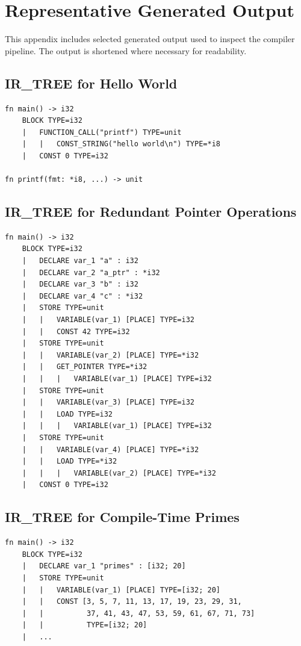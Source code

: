 \chapter{Representative Generated Output}
\label{app:generated}

This appendix includes selected generated output used to inspect the compiler
pipeline. The output is shortened where necessary for readability.

\section{IR\_TREE for Hello World}

\begin{lstlisting}[caption={Typed tree for hello world}]
fn main() -> i32
    BLOCK TYPE=i32
    |   FUNCTION_CALL("printf") TYPE=unit
    |   |   CONST_STRING("hello world\n") TYPE=*i8
    |   CONST 0 TYPE=i32

fn printf(fmt: *i8, ...) -> unit
\end{lstlisting}

\section{IR\_TREE for Redundant Pointer Operations}

\begin{lstlisting}[caption={Simplified redundant address and dereference operations}]
fn main() -> i32
    BLOCK TYPE=i32
    |   DECLARE var_1 "a" : i32
    |   DECLARE var_2 "a_ptr" : *i32
    |   DECLARE var_3 "b" : i32
    |   DECLARE var_4 "c" : *i32
    |   STORE TYPE=unit
    |   |   VARIABLE(var_1) [PLACE] TYPE=i32
    |   |   CONST 42 TYPE=i32
    |   STORE TYPE=unit
    |   |   VARIABLE(var_2) [PLACE] TYPE=*i32
    |   |   GET_POINTER TYPE=*i32
    |   |   |   VARIABLE(var_1) [PLACE] TYPE=i32
    |   STORE TYPE=unit
    |   |   VARIABLE(var_3) [PLACE] TYPE=i32
    |   |   LOAD TYPE=i32
    |   |   |   VARIABLE(var_1) [PLACE] TYPE=i32
    |   STORE TYPE=unit
    |   |   VARIABLE(var_4) [PLACE] TYPE=*i32
    |   |   LOAD TYPE=*i32
    |   |   |   VARIABLE(var_2) [PLACE] TYPE=*i32
    |   CONST 0 TYPE=i32
\end{lstlisting}

\section{IR\_TREE for Compile-Time Primes}

\begin{lstlisting}[caption={Compile-time prime table after evaluation}]
fn main() -> i32
    BLOCK TYPE=i32
    |   DECLARE var_1 "primes" : [i32; 20]
    |   STORE TYPE=unit
    |   |   VARIABLE(var_1) [PLACE] TYPE=[i32; 20]
    |   |   CONST [3, 5, 7, 11, 13, 17, 19, 23, 29, 31,
    |   |          37, 41, 43, 47, 53, 59, 61, 67, 71, 73]
    |   |          TYPE=[i32; 20]
    |   ...
\end{lstlisting}

